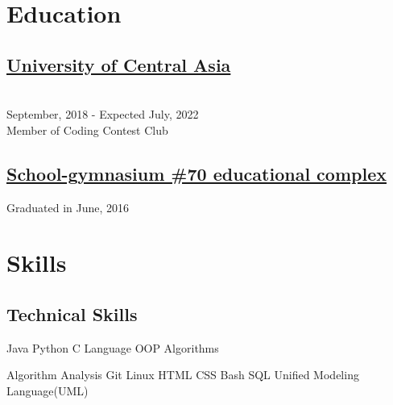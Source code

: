 \documentclass[]{deedy-resume-openfont}
\begin{document}
\begin{minipage}[t]{0.40\textwidth} 


\section{Education} 

\subsection{\href{https://ucentralasia.org/}{University of Central Asia}}\\
September, 2018 - Expected July, 2022\\
Member of Coding Contest Club


\sectionsep

\subsection{\href{https://70.edubishkek.kg/o-nas/}{School-gymnasium \#70 \newline
educational complex}}
Graduated in June, 2016\\









\section{Skills}


\subsection{Technical Skills}
Java \textbullet{}  Python \textbullet{}  C Language %
\textbullet{} OOP
\textbullet{} Algorithms

\textbullet{} Algorithm Analysis \textbullet{} 
Git\textbullet{} Linux \textbullet{}  HTML \textbullet{} CSS \textbullet{} Bash
\textbullet{} SQL \textbullet{} Unified Modeling Language(UML)
\sectionsep


\end{minipage}
\end{document}
